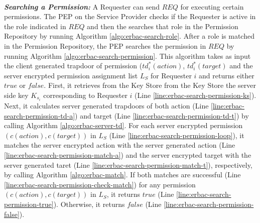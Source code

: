 \documentclass[epsfig,a4paper,11pt,titlepage]{book}
\numberwithin{algorithm}{chapter}
\begin{document}
\noindent \\
\noindent \emph{\textbf{Searching a Permission:}} A Requester can send $\mathit{REQ}$ for executing certain permissions. The \gls{PEP} on the Service Provider checks if the Requester is active in the role indicated in $\mathit{REQ}$ and then the searches that role in the Permission Repository by running Algorithm \ref{algo:erbac-search-role}. After a role is matched in the Permission Repository, the \gls{PEP} searches the permission in $\mathit{REQ}$ by running Algorithm \ref{algo:erbac-search-permission}. This algorithm takes as input the client generated trapdoor of permission ($td^*_i (action)$, $td^*_i (target)$ and the server encrypted permission assignment list $L_{S}$ for Requester $i$ and returns either $\mathit{true}$ or $\mathit{false}$. First, it retrieves from the Key Store from the Key Store the server side key $K_{s_i}$ corresponding to Requester $i$ (Line \ref{line:erbac-search-permission-ks}). Next, it calculates server generated trapdoors of both action (Line \ref{line:erbac-search-permission-td-a}) and target (Line \ref{line:erbac-search-permission-td-t}) by calling Algorithm \ref{algo:erbac-server-td}. For each server encrypted permission $(c(action), c(target))$ in $L_{S}$ (Line \ref{line:erbac-search-permission-loop}), it matches the server encrypted action with the server generated action (Line \ref{line:erbac-search-permission-match-a}) and the server encrypted target with the server generated taret (Line \ref{line:erbac-search-permission-match-t}), respectively, by calling Algorithm \ref{algo:erbac-match}. If both matches are successful (Line \ref{line:erbac-search-permission-check-match}) for any permission $(c(action), c(target))$ in $L_{S}$, it returns $\mathit{true}$ (Line \ref{line:erbac-search-permission-true}). Otherwise, it returns $\mathit{false}$ (Line \ref{line:erbac-search-permission-false}).
\end{document}
